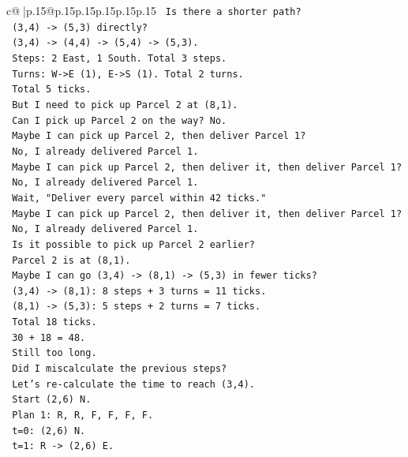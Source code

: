 \documentclass{article}
\begin{document}
{\begin{supertabular}{c@{$\;$}|p{.15\linewidth}@{}p{.15\linewidth}p{.15\linewidth}p{.15\linewidth}p{.15\linewidth}p{.15\linewidth}}
{{{\texttt{   Is there a shorter path?} \\
\texttt{   (3,4) {-}> (5,3) directly?} \\
\texttt{   (3,4) {-}> (4,4) {-}> (5,4) {-}> (5,3).} \\
\texttt{   Steps: 2 East, 1 South. Total 3 steps.} \\
\texttt{   Turns: W{-}>E (1), E{-}>S (1). Total 2 turns.} \\
\texttt{   Total 5 ticks.} \\
\texttt{   But I need to pick up Parcel 2 at (8,1).} \\
\texttt{   Can I pick up Parcel 2 on the way? No.} \\
\texttt{   Maybe I can pick up Parcel 2, then deliver Parcel 1?} \\
\texttt{   No, I already delivered Parcel 1.} \\
\texttt{   Maybe I can pick up Parcel 2, then deliver it, then deliver Parcel 1?} \\
\texttt{   No, I already delivered Parcel 1.} \\
\texttt{   Wait, "Deliver every parcel within 42 ticks."} \\
\texttt{   Maybe I can pick up Parcel 2, then deliver it, then deliver Parcel 1?} \\
\texttt{   No, I already delivered Parcel 1.} \\
\texttt{   Is it possible to pick up Parcel 2 earlier?} \\
\texttt{   Parcel 2 is at (8,1).} \\
\texttt{   Maybe I can go (3,4) {-}> (8,1) {-}> (5,3) in fewer ticks?} \\
\texttt{   (3,4) {-}> (8,1): 8 steps + 3 turns = 11 ticks.} \\
\texttt{   (8,1) {-}> (5,3): 5 steps + 2 turns = 7 ticks.} \\
\texttt{   Total 18 ticks.} \\
\texttt{   30 + 18 = 48.} \\
\texttt{   Still too long.} \\
\texttt{   Did I miscalculate the previous steps?} \\
\texttt{   Let's re{-}calculate the time to reach (3,4).} \\
\texttt{   Start (2,6) N.} \\
\texttt{   Plan 1: R, R, F, F, F, F.} \\
\texttt{   t=0: (2,6) N.} \\
\texttt{   t=1: R {-}> (2,6) E.} \\
}}}
\end{supertabular}}
\end{document}
